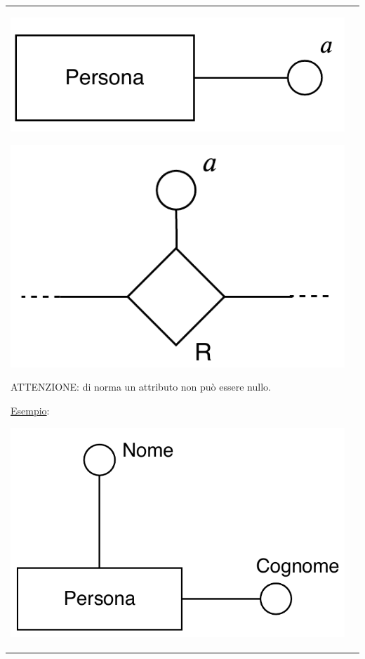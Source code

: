 \documentclass[a4paper, 10pt]{report}
\begin{document}
\begin{longtable}{| p{} | p{} |}
\begin{center}
\includegraphics[scale=0.40]{immagine9.pdf}

\includegraphics[scale=0.40]{immagine10.pdf}
\end{center}

ATTENZIONE: di norma un attributo non può essere nullo.

\underline{Esempio}:

\begin{center}
\includegraphics[scale=0.40]{immagine11.pdf}
\end{center}

\end{longtable}
\end{document}
